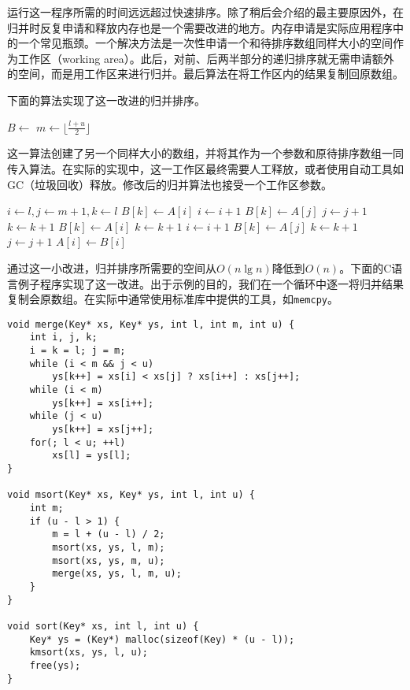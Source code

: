 \documentclass[UTF8]{article}
\begin{document}
运行这一程序所需的时间远远超过快速排序。除了稍后会介绍的最主要原因外，在归并时反复申请和释放内存也是一个需要改进的地方。内存申请是实际应用程序中的一个常见瓶颈\cite{pearls}。一个解决方法是一次性申请一个和待排序数组同样大小的空间作为工作区（working area）。此后，对前、后两半部分的递归排序就无需申请额外的空间，而是用工作区来进行归并。最后算法在将工作区内的结果复制回原数组。

下面的算法实现了这一改进的归并排序。

\begin{algorithmic}[1]
  \State $B \gets $ 
  \State {}
\EndProcedure
\Statex
{}
    \State $m \gets \lfloor \frac{l + u}{2} \rfloor$
    \State {}
    \State {}
    \State {}
  \EndIf
\EndProcedure
\end{algorithmic}

这一算法创建了另一个同样大小的数组，并将其作为一个参数和原待排序数组一同传入算法。在实际的实现中，这一工作区最终需要人工释放，或者使用自动工具如GC（垃圾回收）释放。修改后的归并算法也接受一个工作区参数。

\begin{algorithmic}[1]
  \State $i \gets l, j \gets m + 1, k \gets l$
      \State $B[k] \gets A[i]$
      \State $i \gets i + 1$
    \Else
      \State $B[k] \gets A[j]$
      \State $j \gets j + 1$
    \EndIf
    \State $k \gets k + 1$
  \EndWhile
    \State $B[k] \gets A[i]$
    \State $k \gets k + 1$
    \State $i \gets i + 1$
  \EndWhile
    \State $B[k] \gets A[j]$
    \State $k \gets k + 1$
    \State $j \gets j + 1$
  \EndWhile
   
    \State $A[i] \gets B[i]$
  \EndFor
\EndProcedure
\end{algorithmic}

通过这一小改进，归并排序所需要的空间从$O(n \lg n)$降低到$O(n)$。下面的C语言例子程序实现了这一改进。出于示例的目的，我们在一个循环中逐一将归并结果复制会原数组。在实际中通常使用标准库中提供的工具，如\texttt{memcpy}。

\lstset{language=C}
\begin{lstlisting}
void merge(Key* xs, Key* ys, int l, int m, int u) {
    int i, j, k;
    i = k = l; j = m;
    while (i < m && j < u)
        ys[k++] = xs[i] < xs[j] ? xs[i++] : xs[j++];
    while (i < m)
        ys[k++] = xs[i++];
    while (j < u)
        ys[k++] = xs[j++];
    for(; l < u; ++l)
        xs[l] = ys[l];
}

void msort(Key* xs, Key* ys, int l, int u) {
    int m;
    if (u - l > 1) {
        m = l + (u - l) / 2;
        msort(xs, ys, l, m);
        msort(xs, ys, m, u);
        merge(xs, ys, l, m, u);
    }
}

void sort(Key* xs, int l, int u) {
    Key* ys = (Key*) malloc(sizeof(Key) * (u - l));
    kmsort(xs, ys, l, u);
    free(ys);
}
\end{lstlisting}
\end{document}
